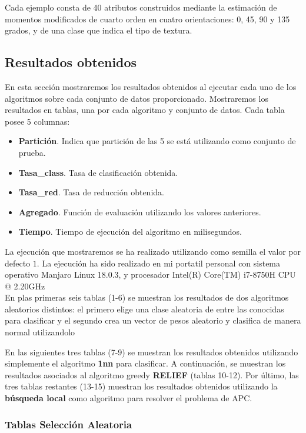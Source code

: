 \documentclass[size=a4, parskip=half, titlepage=false, toc=flat, toc=bib, 12pt]{scrartcl}
\begin{document}
Cada ejemplo consta de 40 atributos construidos mediante la estimación de momentos modificados de cuarto orden en cuatro orientaciones: 0, 45, 90 y 135 grados, y de una clase que indica el tipo de textura.

\subsection{Resultados obtenidos}
En esta sección mostraremos los resultados obtenidos al ejecutar cada uno de los algoritmos sobre cada conjunto de datos proporcionado. Mostraremos los resultados en tablas, una por cada algoritmo y conjunto de datos. Cada tabla posee 5 columnas:
\begin{itemize}
    \item \textbf{Partición}. Indica que partición de las 5 se está utilizando como conjunto de prueba.
    \item \textbf{Tasa\_class}. Tasa de clasificación obtenida.
    \item \textbf{Tasa\_red}. Tasa de reducción obtenida.
    \item \textbf{Agregado}. Función de evaluación utilizando los valores anteriores.
    \item \textbf{Tiempo}. Tiempo de ejecución del algoritmo en milisegundos.
\end{itemize}

La ejecución que mostraremos se ha realizado utilizando como semilla el valor por defecto $1$. La ejecución ha sido realizado en mi portatil personal con sistema operativo Manjaro Linux 18.0.3, y procesador Intel(R) Core(TM) i7-8750H CPU @ 2.20GHz\\

En plas primeras seis tablas (1-6) se muestran los resultados de dos algoritmos aleatorios distintos: el primero elige una clase aleatoria de entre las conocidas para clasificar y el segundo crea un vector de pesos aleatorio y clasifica de manera normal utilizandolo

En las siguientes tres tablas (7-9) se muestran los resultados obtenidos utilizando simplemente el algoritmo \textbf{1nn} para clasificar. A continuación, se muestran los resultados asociados al algoritmo greedy \textbf{RELIEF} (tablas 10-12). Por último, las tres tablas restantes (13-15) muestran los resultados obtenidos utilizando la \textbf{búsqueda local} como algoritmo para resolver el problema de APC.

\newpage
\subsubsection{Tablas Selección Aleatoria}
\end{document}
